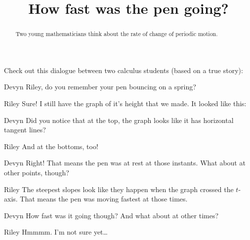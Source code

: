 \documentclass{ximera}
\title[Break-Ground:]{How fast was the pen going?}
\begin{document}
\begin{abstract}
  Two young mathematicians think about the rate of change of periodic motion.
\end{abstract}
\maketitle

Check out this dialogue between two calculus students (based on a true
story):

\begin{dialogue}
\item[Devyn] Riley, do you remember your pen bouncing on a spring?
\item[Riley] Sure!  I still have the graph of it's height that we made.  It looked like this:
\begin{image}
  \end{image}

\item[Devyn] Did you notice that at the top, the graph looks like it has horizontal tangent lines?
\item[Riley] And at the bottoms, too!
\item[Devyn] Right!  That means the pen was at rest at those instants.  What about at other points, though?
\item[Riley] The steepest slopes look like they happen when the graph crossed the $t$-axis.  That means the pen was
moving fastest at those times.
\item[Devyn] How fast was it going though?  And what about at other times?
\item[Riley] Hmmmm. I'm not sure yet\dots
\end{dialogue}
\end{document}
